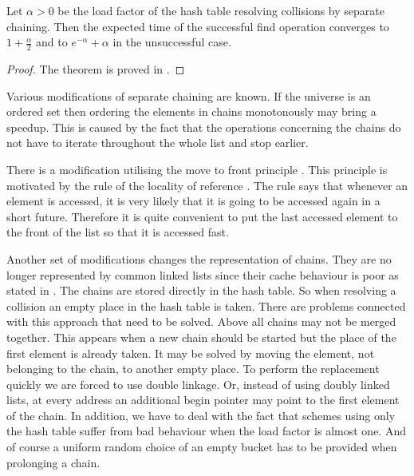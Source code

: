 \begin{theorem}
Let $\alpha > 0$ be the load factor of the hash table resolving collisions by separate chaining. Then the expected time of the successful find operation converges to $1 + \frac{\alpha}{2}$ and to $e^{-\alpha} + \alpha$ in the unsuccessful case.
\end{theorem}
\begin{proof}
The theorem is proved in \cite{DBLP:books/sp/Mehlhorn84}.
\end{proof}

Various modifications of separate chaining are known. If the universe is an ordered set then ordering the elements in chains monotonously may bring a speedup. This is caused by the fact that the operations concerning the chains do not have to iterate throughout the whole list and stop earlier. 

There is a modification utilising the move to front principle \cite{723912}. This principle is motivated by the rule of the locality of reference \cite{DBLP:books/aw/AhoSU86}. The rule says that whenever an element is accessed, it is very likely that it is going to be accessed again in a short future. Therefore it is quite convenient to put the last accessed element to the front of the list so that it is accessed fast.

Another set of modifications changes the representation of chains. They are no longer represented by common linked lists since their cache behaviour \cite{1200662} is poor as stated in \cite{Rubin99virtualcache}. The chains are stored directly in the hash table. So when resolving a collision an empty place in the hash table is taken. There are problems connected with this approach that need to be solved. Above all chains may not be merged together. This appears when a new chain should be started but the place of the first element is already taken. It may be solved by moving the element, not belonging to the chain, to another empty place. To perform the replacement quickly we are forced to use double linkage. Or, instead of using doubly linked lists, at every address an additional begin pointer may point to the first element of the chain. In addition, we have to deal with the fact that schemes using only the hash table suffer from bad behaviour when the load factor is almost one. And of course a uniform random choice of an empty bucket has to be provided when prolonging a chain.

